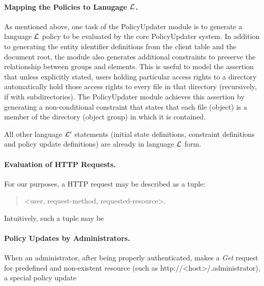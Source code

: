 \documentclass{llncs}
\begin{document}
      \paragraph{\bf Mapping the Policies to Lanugage ${\cal L}$.}

        As mentioned above, one task of the PolicyUpdater module is to generate
        a language ${\cal L}$ policy to be evaluated by the core PolicyUpdater
        system. In addition to generating the entity identifier definitions
        from the client table and the document root, the module also generates
        additional constraints to preserve the relationship between groups
        and elements. This is useful to model the assertion that unless
        explicitly stated, users holding particular access rights to a
        directory automatically hold those access rights to every file in
        that directory (recursively, if with subdirectories). The PolicyUpdater
        module achieves this assertion by generating a non-conditional
        constraint that states that each file (object) is a member of the
        directory (object group) in which it is contained.

        All other language ${\cal L'}$ statements (initial state definitions,
        constraint definitions and policy update definitions) are already in
        language ${\cal L}$ form.

      \paragraph{\bf Evaluation of HTTP Requests.}

        For our purposes, a HTTP request may be described as a tuple:

        \begin{quote}
          <user, request-method, requested-resource>.
        \end{quote}

Intuitively, such a tuple may be
        

      \paragraph{\bf Policy Updates by Administrators.}

        When an administrator, after being properly authenticated, makes a
        {\em Get} request for predefined and non-existent resource (such as
        http://<host>/.administrator), a special policy update 
        
\end{document}
